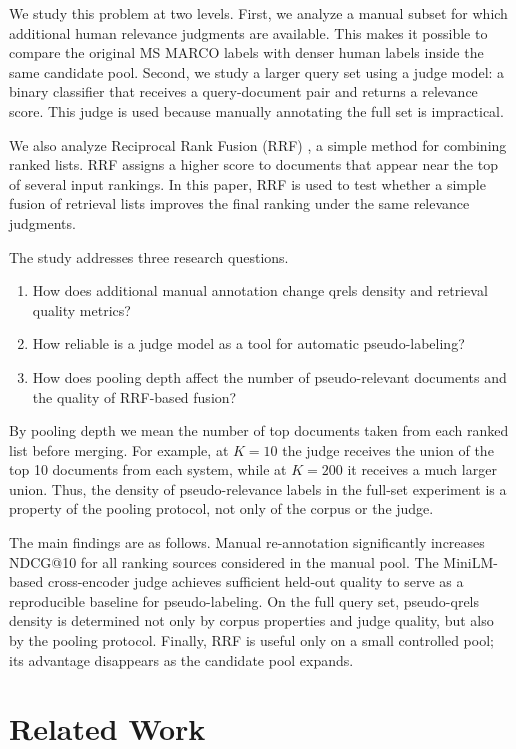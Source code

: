 \documentclass[runningheads,a4paper]{llncs}
\begin{document}
We study this problem at two levels. First, we analyze a manual subset for which additional human relevance judgments are available. This makes it possible to compare the original MS MARCO labels with denser human labels inside the same candidate pool. Second, we study a larger query set using a judge model: a binary classifier that receives a query-document pair and returns a relevance score. This judge is used because manually annotating the full set is impractical.

We also analyze Reciprocal Rank Fusion (RRF) \cite{cormack2009rrf}, a simple method for combining ranked lists. RRF assigns a higher score to documents that appear near the top of several input rankings. In this paper, RRF is used to test whether a simple fusion of retrieval lists improves the final ranking under the same relevance judgments.

The study addresses three research questions.
\begin{enumerate}
\item How does additional manual annotation change qrels density and retrieval quality metrics?
\item How reliable is a judge model as a tool for automatic pseudo-labeling?
\item How does pooling depth affect the number of pseudo-relevant documents and the quality of RRF-based fusion?
\end{enumerate}

By pooling depth we mean the number of top documents taken from each ranked list before merging. For example, at $K=10$ the judge receives the union of the top 10 documents from each system, while at $K=200$ it receives a much larger union. Thus, the density of pseudo-relevance labels in the full-set experiment is a property of the pooling protocol, not only of the corpus or the judge.

The main findings are as follows. Manual re-annotation significantly increases NDCG@10 for all ranking sources considered in the manual pool. The MiniLM-based cross-encoder judge \cite{wang2020minilm,reimers2019sentencebert} achieves sufficient held-out quality to serve as a reproducible baseline for pseudo-labeling. On the full query set, pseudo-qrels density is determined not only by corpus properties and judge quality, but also by the pooling protocol. Finally, RRF is useful only on a small controlled pool; its advantage disappears as the candidate pool expands.

\section{Related Work}
\end{document}
